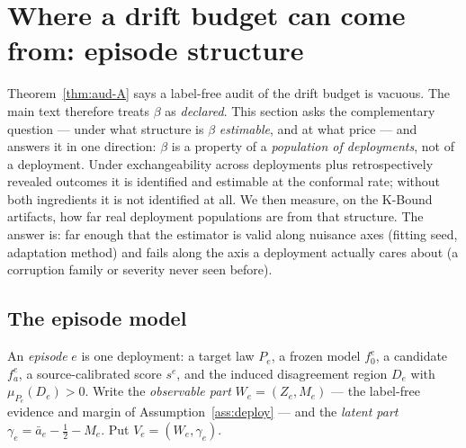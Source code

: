 %
%

\section{Where a drift budget can come from: episode structure}
\label{app:episode-beta}

Theorem~\ref{thm:aud-A} says a label-free audit of the drift budget is vacuous. The main text
therefore treats $\beta$ as \emph{declared}. This section asks the complementary question --- under
what structure is $\beta$ \emph{estimable}, and at what price --- and answers it in one direction:
$\beta$ is a property of a \emph{population of deployments}, not of a deployment. Under
exchangeability across deployments plus retrospectively revealed outcomes it is identified and
estimable at the conformal rate; without both ingredients it is not identified at all. We then
measure, on the K-Bound artifacts, how far real deployment populations are from that structure. The
answer is: far enough that the estimator is valid along nuisance axes (fitting seed, adaptation
method) and fails along the axis a deployment actually cares about (a corruption family or severity
never seen before).

\subsection{The episode model}

\begin{definition}\label{epi:def-episode}
An \emph{episode} $e$ is one deployment: a target law $P_e$, a frozen model $f_0^e$, a candidate
$f_a^e$, a source-calibrated score $s^e$, and the induced disagreement region $D_e$ with
$\mu_{P_e}(D_e)>0$. Write the \emph{observable part}
$W_e=(Z_e,M_e)$ --- the label-free evidence and margin of Assumption~\ref{ass:deploy} --- and the
\emph{latent part} $\gamma_e=\bar a_e-\tfrac12-M_e$. Put $V_e=(W_e,\gamma_e)$.
\end{definition}

